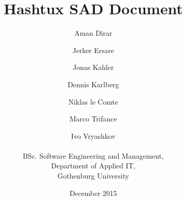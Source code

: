 \title{Hashtux SAD Document}
\author{Aman Dirar \and Jerker Ersare \and Jonas Kahler \and Dennis Karlberg
        \and Niklas le Comte \and Marco Trifance \and Ivo Vryashkov \\ \\
        BSc. Software Engineering and Management, \\
        Department of Applied IT, \\ Gothenburg University}
\date{December 2015}
\maketitle
